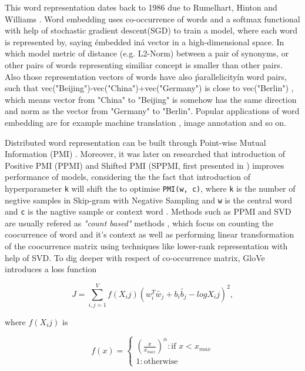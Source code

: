 \documentclass[11pt,a4paper]{article}
\begin{document}
This word representation dates back to 1986 due to Rumelhart, Hinton and Williams \cite{williams1986learning}. Word embedding uses co-occurrence of words and a softmax functional with help of stochastic gradient descent(SGD) to train a model, where each word is represented by, saying \'embedded in\' a vector in a high-dimensional space. In which model metric of distance (e.g. L2-Norm) between a pair of synonyms, or other pairs of words representing similiar concept is smaller than other pairs. Also those representation vectors of words have also \'parallelicity\' in word pairs, such that vec("Beijing")-vec("China")+vec("Germany") is close to vec("Berlin") \cite{le2014distributed}, which means vector from "China" to "Beijing" is somehow has the same direction and norm as the vector from "Germany" to "Berlin". Popular applications of word embedding are for example machine translation \cite{cho2014learning}, image annotation \cite{weston2011wsabie} and so on. 

Distributed word representation can be built through Point-wise Mutual Information (PMI) \cite{church1990word}. Moreover, it was later on researched that introduction of Positive PMI (PPMI) \cite{bullinaria2007extracting} and Shifted PMI (SPPMI, first presented in \cite{goldberg2014word2vec}) improves performance of models, considering the the fact that introduction of hyperparameter \verb|k| will shift the to optimise \verb|PMI(w, c)|, where \verb|k| is the number of negtive samples in Skip-gram with Negative Sampling and \verb|w| is the central word and \verb|c| is the nagtive sample or context word \cite{levy2014neural}. Methods such as PPMI and SVD are usually refered as \emph{"count based"} methods \cite{levy2015improving}, which focus on counting the coocurrence of word and it's context as well as performing linear transformation of the coocurrence matrix using techniques like lower-rank representation with help of SVD. To dig deeper with respect of co-occurrence matrix, GloVe \cite{Pennington2014glove} introduces a loss function

\begin{equation}
J=\sum_{i,j=1}^{V}f(X_ij)(w_i^T\tilde{w_j}+b_i\tilde{b_j}-logX_ij)^2,
\end{equation}

where $f(X_ij)$ is

\[f(x)=\begin{cases}
    (\frac{x}{x_{max}})^\alpha : \text{if }x<x_{max}\\
    1 : \text{otherwise}
    \end{cases}
\]
\end{document}
